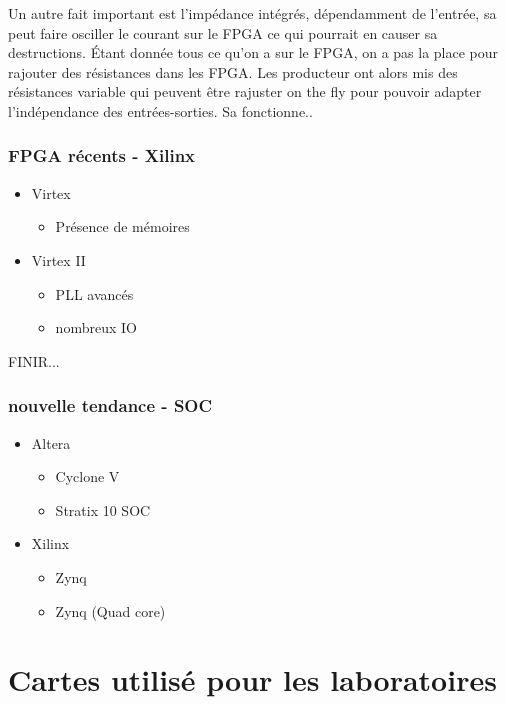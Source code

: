 \documentclass[oneside]{book}
\begin{document}
    Un autre fait important est l'impédance intégrés, dépendamment de l'entrée, sa peut faire osciller le courant sur le FPGA ce qui pourrait en causer sa destructions. Étant donnée tous ce qu'on a sur le FPGA, on a pas la place pour rajouter des résistances dans les FPGA. Les producteur ont alors mis des résistances variable qui peuvent être rajuster on the fly pour pouvoir adapter l'indépendance des entrées-sorties. Sa fonctionne..
    
        \subsubsection{FPGA récents - Xilinx}
        \begin{itemize}
            \item Virtex
            \begin{itemize}
                \item Présence de mémoires
            \end{itemize}
            \item Virtex II
            \begin{itemize}
                \item PLL avancés
                \item nombreux IO
            \end{itemize}
        \end{itemize}
        FINIR...
        
        \subsubsection{nouvelle tendance - SOC}
        \begin{itemize}
            \item Altera
            \begin{itemize}
                \item Cyclone V
                \item Stratix 10 SOC
            \end{itemize}
            \item Xilinx
            \begin{itemize}
                \item Zynq
                \item Zynq (Quad core)
            \end{itemize}
        \end{itemize}
        
    \section{Cartes utilisé pour les laboratoires}
\end{document}
